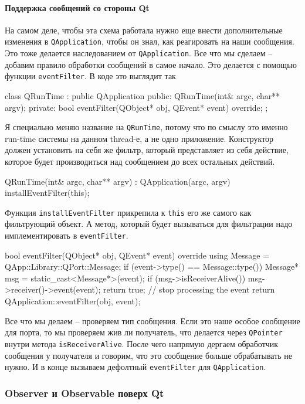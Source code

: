 \paragraph{Поддержка сообщений со стороны Qt}

На самом деле, чтобы эта схема работала нужно еще внести дополнительные изменения в \verb"QApplication", чтобы он знал, как реагировать на наши сообщения.
Это тоже делается наследованием от \verb"QApplication".
Все что мы сделаем -- добавим правило обработки сообщений в самое начало.
Это делается с помощью функции \verb"eventFilter".
В коде это выглядит так
\begin{cppcode}
class QRunTime : public QApplication {
public:
  QRunTime(int& argc, char** argv);
private:
  bool eventFilter(QObject* obj, QEvent* event) override;
};
\end{cppcode}
Я специально меняю название на \verb"QRunTime", потому что по смыслу это именно run-time системы на данном thread-е, а не одно приложение.
Конструктор должен установить на себя же фильтр, который представляет из себя действие, которое будет производиться над сообщением до всех остальных действий.
\begin{cppcode}
QRunTime(int& argc, char** argv) : QApplication(argc, argv) {
  installEventFilter(this);
}
\end{cppcode}
Функция \verb"installEventFilter" прикрепила к \verb"this" его же самого как фильтрующий объект.
А метод, который будет вызываться для фильтрации надо имплементировать в \verb"eventFilter".
\begin{cppcode}
bool eventFilter(QObject* obj, QEvent* event) override {
  using Message = QApp::Library::QPort::Message;
  if (event->type() == Message::type()) {
    Message* msg = static_cast<Message*>(event);
    if (msg->isReceiverAlive())
      msg->receiver()->event(event);
    return true; // stop processing the event
  }
  return QApplication::eventFilter(obj, event);
}
\end{cppcode}
Все что мы делаем -- проверяем тип сообщения.
Если это наше особое сообщение для порта, то мы проверяем жив ли получатель, что делается через \verb"QPointer" внутри метода \verb"isReceiverAlive".
После чего напрямую дергаем обработчик сообщения у получателя и говорим, что это сообщение больше обрабатывать не нужно.
И в конце вызываем дефолтный \verb"eventFilter" для \verb"QApplication".

\subsubsection{Observer и Observable поверх Qt}

